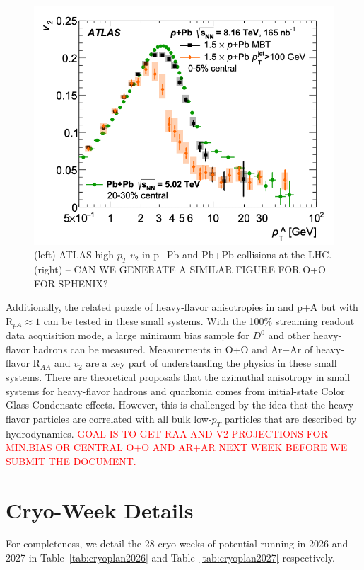 \begin{figure}
    \centering
    \includegraphics[width=0.47\linewidth]{figs/figure_atlas_highptv2_ppb.png}
    \caption{(left) ATLAS high-$p_{T}$ $v_{2}$ in p+Pb and Pb+Pb collisions at the LHC.
    (right) -- CAN WE GENERATE A SIMILAR FIGURE FOR O+O FOR SPHENIX? {\color{red}{DVP: Yes, but after the initial circulation to the Collaboration}}}
    \label{fig:atlaspbhighpt}
\end{figure}

Additionally, the related puzzle of heavy-flavor anisotropies in \pp and p+A but with R$_{pA} \approx 1$ can be tested in these small systems.   With the 100\% streaming readout data acquisition mode, a large minimum bias sample for $D^{0}$ and other heavy-flavor hadrons can be measured.    Measurements in O+O and Ar+Ar of heavy-flavor R$_{AA}$ and $v_{2}$ are a key part of understanding the physics in these small systems.   There are theoretical proposals that the azimuthal anisotropy in small systems for heavy-flavor hadrons and quarkonia comes from initial-state Color Glass Condensate effects.   However, this is challenged by the idea that the heavy-flavor particles are correlated with all bulk low-$p_{T}$ particles that are described by hydrodynamics.
{\textcolor{red}{GOAL IS TO GET RAA AND V2 PROJECTIONS FOR MIN.BIAS OR CENTRAL O+O AND AR+AR NEXT WEEK BEFORE WE SUBMIT THE DOCUMENT.}}

\FloatBarrier

\newpage
\section{Cryo-Week Details}
\label{sec:cryo20262027}

For completeness, we detail the 28 cryo-weeks of potential running in 2026 and 2027 in Table~\ref{tab:cryoplan2026} and Table~\ref{tab:cryoplan2027} respectively.

